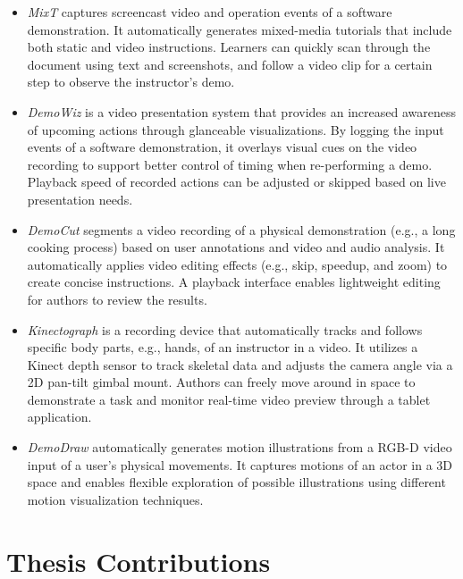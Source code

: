 \begin{itemize}
\setlength{\itemsep}{0pt}
\item \emph{MixT} captures screencast video and operation events of a software demonstration. It automatically generates mixed-media tutorials that include both static and video instructions. Learners can quickly scan through the document using text and screenshots, and follow a video clip for a certain step to observe the instructor's demo.
\item \emph{DemoWiz} is a video presentation system that provides an increased awareness of upcoming actions through glanceable visualizations. By logging the input events of a software demonstration, it overlays visual cues on the video recording to support better control of timing when re-performing a demo. Playback speed of recorded actions can be adjusted or skipped based on live presentation needs.
\item \emph{DemoCut} segments a video recording of a physical demonstration (e.g., a long cooking process) based on user annotations and video and audio analysis. It automatically applies video editing effects (e.g., skip, speedup, and zoom) to create concise instructions. A playback interface enables lightweight editing for authors to review the results.
\item \emph{Kinectograph} is a recording device that automatically tracks and follows specific body parts, e.g., hands, of an instructor in a video. It utilizes a Kinect depth sensor to track skeletal data and adjusts the camera angle via a 2D pan-tilt gimbal mount. Authors can freely move around in space to demonstrate a task and monitor real-time video preview through a tablet application.
\item \emph{DemoDraw} automatically generates motion illustrations from a RGB-D video input of a user's physical movements. It captures motions of an actor in a 3D space and enables flexible exploration of possible illustrations using different motion visualization techniques.
\end{itemize}

\section{Thesis Contributions}

